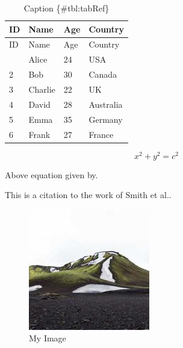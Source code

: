 \documentclass[
  12pt,
  a4paper,
  ]{report}
\begin{document}

\begin{longtable}[]{@{}llll@{}}
\caption{Caption \{\#tbl:tabRef\}}\tabularnewline
\toprule\noalign{}
ID & Name & Age & Country \\
\midrule\noalign{}
\endfirsthead
\toprule\noalign{}
ID & Name & Age & Country \\
\midrule\noalign{}
\endhead
\bottomrule\noalign{}
\endlastfoot
1 & Alice & 24 & USA \\
2 & Bob & 30 & Canada \\
3 & Charlie & 22 & UK \\
4 & David & 28 & Australia \\
5 & Emma & 35 & Germany \\
6 & Frank & 27 & France \\
\end{longtable}

\[ x^2 + y^2 = c^2 \]

Above equation given by.\autocite{Einstein1905}

This is a citation to the work of Smith et al..\autocite{smith2021}

\begin{figure}
\centering
\includegraphics{./resources/img.jpg}
\caption{My Image}\label{fig:imgRef}
\end{figure}
\printbibliography
\end{document}

